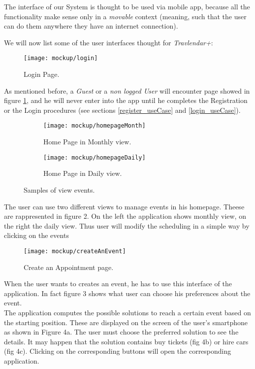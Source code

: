 The interface of our System is thought to be used via mobile app, because all the functionality make sense only in a \textit{movable} context (meaning, such that the user can do them anywhere they have an internet connection).

We will now list some of the user interfaces thought for \textit{Travlendar+}:

\begin{figure}[h]
	\texttt{[image: mockup/login]}
	\centering
	\caption{Login Page.}
	\label{fig:login}
\end{figure}
As mentioned before, a \textit{Guest} or a \textit{non logged User} will encounter page showed in figure \ref{fig:login}, and he will never enter into the app until he completes the Registration or the Login procedures (see sections \ref{register_useCase} and \ref{login_useCase}).

\begin{figure}[H]
	\begin{subfigure}{0.5\textwidth}
		\texttt{[image: mockup/homepageMonth]} 
		\centering
		\caption{Home Page in Monthly view.}
		\label{fig:homePage_Month}
	\end{subfigure}
	\begin{subfigure}{0.5\textwidth}
		\texttt{[image: mockup/homepageDaily]} 
		\centering
		\caption{Home Page in Daily view.}
		\label{fig:homePage_Day}
	\end{subfigure}
	\caption{Samples of view events.}
\end{figure}
The user can use two different views to manage events in his homepage. Theese are rappresented in figure 2. On the left the application shows monthly view, on the right the daily view. Thus user will modify the scheduling in a simple way by clicking on the events

\begin{figure}[H]
	\texttt{[image: mockup/createAnEvent]}
	\centering
	\caption{Create an Appointment page.}
	\label{fig:createEvent}
\end{figure}
When the user wants to creates an event, he has to use this interface of the application. In fact figure 3 shows what user can choose his preferences about the event.\\

The application computes the possible solutions to reach a certain event based on the starting position. These are displayed on the screen of the user's smartphone as shown in Figure 4a. The user must choose the preferred solution to see the details. It may happen that the solution contains buy tickets (fig 4b) or hire cars (fig 4c). Clicking on the corresponding buttons will open the corresponding application.

